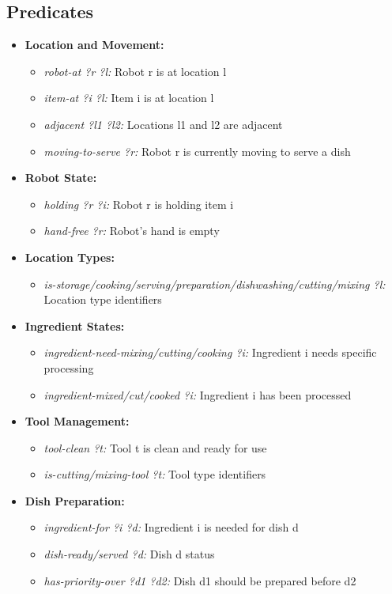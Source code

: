 \documentclass{article}
\begin{document}
\subsection{Predicates}\label{sec:pred}
\begin{itemize}[label=--, itemsep=0.05em]
    \item \textbf{Location and Movement:}
    \begin{itemize}
        \item \textit{robot-at ?r ?l:} Robot r is at location l
        \item \textit{item-at ?i ?l:} Item i is at location l
        \item \textit{adjacent ?l1 ?l2:} Locations l1 and l2 are adjacent
        \item \textit{moving-to-serve ?r:} Robot r is currently moving to serve a dish
    \end{itemize}
    \item \textbf{Robot State:}
    \begin{itemize}
        \item \textit{holding ?r ?i:} Robot r is holding item i
        \item \textit{hand-free ?r:} Robot's hand is empty
    \end{itemize}
    \item \textbf{Location Types:}
    \begin{itemize}
        \item \textit{is-storage/cooking/serving/preparation/dishwashing/cutting/mixing ?l:} Location type identifiers
    \end{itemize}
    \item \textbf{Ingredient States:}
    \begin{itemize}
        \item \textit{ingredient-need-mixing/cutting/cooking ?i:} Ingredient i needs specific processing
        \item \textit{ingredient-mixed/cut/cooked ?i:} Ingredient i has been processed
    \end{itemize}
    \item \textbf{Tool Management:}
    \begin{itemize}
        \item \textit{tool-clean ?t:} Tool t is clean and ready for use
        \item \textit{is-cutting/mixing-tool ?t:} Tool type identifiers
    \end{itemize}
    \item \textbf{Dish Preparation:}
    \begin{itemize}
        \item \textit{ingredient-for ?i ?d:} Ingredient i is needed for dish d
        \item \textit{dish-ready/served ?d:} Dish d status
        \item \textit{has-priority-over ?d1 ?d2:} Dish d1 should be prepared before d2
    \end{itemize}
\end{itemize}
\end{document}
